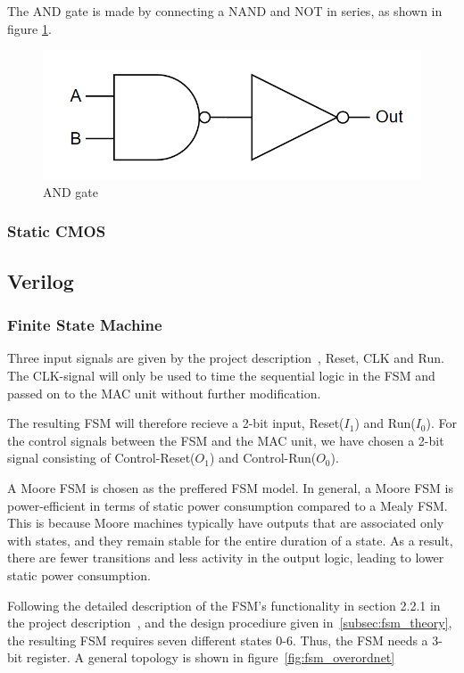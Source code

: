 The AND gate is made by connecting a NAND and NOT in series, as shown in figure \ref{fig:AND}.
\begin{figure}[H]
    \centering
    \includegraphics[width=0.4\linewidth]{Figures/And gate.png}
    \caption{AND gate}
    \label{fig:AND}
\end{figure}

\subsubsection{Static CMOS}

\subsection{Verilog}


\subsubsection{Finite State Machine}
\label{subsec:fsm_}

Three input signals are given by the project description~\cite{project_description}, Reset, CLK and Run. The CLK-signal will only be used to time the sequential logic in the FSM and passed on to the MAC unit without further modification.

The resulting FSM will therefore recieve a 2-bit input, Reset($I_1$) and Run($I_0$). For the control signals between the FSM and the MAC unit, we have chosen a 2-bit signal consisting of Control-Reset($O_1$) and Control-Run($O_0$). 

A Moore FSM is chosen as the preffered FSM model. In general, a Moore FSM is power-efficient in terms of static power consumption compared to a Mealy FSM. This is because Moore machines typically have outputs that are associated only with states, and they remain stable for the entire duration of a state. As a result, there are fewer transitions and less activity in the output logic, leading to lower static power consumption.

Following the detailed description of the FSM's functionality in section 2.2.1 in the project description~\cite{project_description}, and the design procediure given in~\ref{subsec:fsm_theory}, the resulting FSM requires seven different states 0-6. Thus, the FSM needs a 3-bit register. A general topology is shown in figure~\ref{fig:fsm_overordnet}

